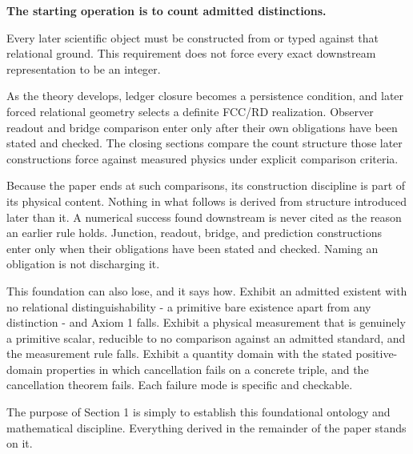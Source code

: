 \textbf{The starting operation is to count admitted distinctions.}

Every later scientific object must be constructed from or typed against that relational ground. This requirement does not force every exact downstream representation to be an integer.

As the theory develops, ledger closure becomes a persistence condition, and later forced relational geometry selects a definite FCC/RD realization. Observer readout and bridge comparison enter only after their own obligations have been stated and checked. The closing sections compare the count structure those later constructions force against measured physics under explicit comparison criteria.

Because the paper ends at such comparisons, its construction discipline is part of its physical content. Nothing in what follows is derived from structure introduced later than it. A numerical success found downstream is never cited as the reason an earlier rule holds. Junction, readout, bridge, and prediction constructions enter only when their obligations have been stated and checked. Naming an obligation is not discharging it.

This foundation can also lose, and it says how. Exhibit an admitted existent with no relational distinguishability - a primitive bare existence apart from any distinction - and Axiom 1 falls. Exhibit a physical measurement that is genuinely a primitive scalar, reducible to no comparison against an admitted standard, and the measurement rule falls. Exhibit a quantity domain with the stated positive-domain properties in which cancellation fails on a concrete triple, and the cancellation theorem fails. Each failure mode is specific and checkable.

The purpose of Section 1 is simply to establish this foundational ontology and mathematical discipline. Everything derived in the remainder of the paper stands on it.

